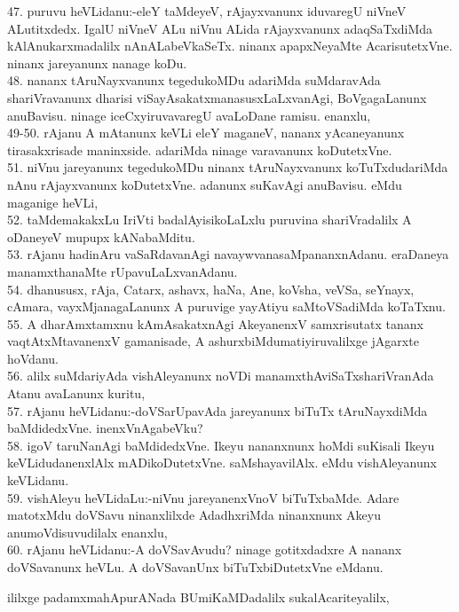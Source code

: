 \documentclass{article}
\begin{document}
47. puruvu heVLidanu:-eleY taMdeyeV, rAjayxvanunx iduvaregU niVneV ALutitxdedx. IgalU niVneV ALu niVnu ALida rAjayxvanunx adaqSaTxdiMda kAlAnukarxmadalilx nAnALabeVkaSeTx. ninanx apapxNeyaMte AcarisutetxVne. ninanx jareyanunx nanage koDu.\\
48. nananx tAruNayxvanunx tegedukoMDu adariMda suMdaravAda shariVravanunx dharisi viSayAsakatxmanasusxLaLxvanAgi, BoVgagaLanunx anuBavisu. ninage iceCxyiruvavaregU avaLoDane ramisu. enanxlu,\\
49-50. rAjanu A mAtanunx keVLi eleY maganeV, nananx yAcaneyanunx tirasakxrisade maninxside. adariMda ninage varavanunx koDutetxVne.\\
51. niVnu jareyanunx tegedukoMDu ninanx tAruNayxvanunx koTuTxdudariMda nAnu rAjayxvanunx koDutetxVne. adanunx suKavAgi anuBavisu. eMdu maganige heVLi,\\
52. taMdemakakxLu IriVti badalAyisikoLaLxlu puruvina shariVradalilx A oDaneyeV mupupx kANabaMditu.\\
53. rAjanu hadinAru vaSaRdavanAgi navaywvanasaMpananxnAdanu. eraDaneya manamxthanaMte rUpavuLaLxvanAdanu.\\
54. dhanususx, rAja, Catarx, ashavx, haNa, Ane, koVsha, veVSa, seYnayx, cAmara, vayxMjanagaLanunx A puruvige yayAtiyu saMtoVSadiMda koTaTxnu.\\
55. A dharAmxtamxnu kAmAsakatxnAgi AkeyanenxV samxrisutatx tananx vaqtAtxMtavanenxV gamanisade, A ashurxbiMdumatiyiruvalilxge jAgarxte hoVdanu.\\
56. alilx suMdariyAda vishAleyanunx noVDi manamxthAviSaTxshariVranAda Atanu avaLanunx kuritu, \\
57. rAjanu heVLidanu:-doVSarUpavAda jareyanunx biTuTx tAruNayxdiMda baMdidedxVne. inenxVnAgabeVku?\\
58. igoV taruNanAgi baMdidedxVne. Ikeyu nananxnunx hoMdi suKisali Ikeyu keVLidudanenxlAlx mADikoDutetxVne. saMshayavilAlx. eMdu vishAleyanunx keVLidanu.\\
59. vishAleyu heVLidaLu:-niVnu jareyanenxVnoV biTuTxbaMde. Adare matotxMdu doVSavu ninanxlilxde AdadhxriMda ninanxnunx Akeyu anumoVdisuvudilalx enanxlu,\\
60. rAjanu heVLidanu:-A doVSavAvudu? ninage gotitxdadxre A nananx doVSavanunx heVLu. A doVSavanUnx biTuTxbiDutetxVne eMdanu.\\

\begin{center}
ililxge padamxmahApurANada BUmiKaMDadalilx sukalAcariteyalilx,
\end{center}
\end{document}
